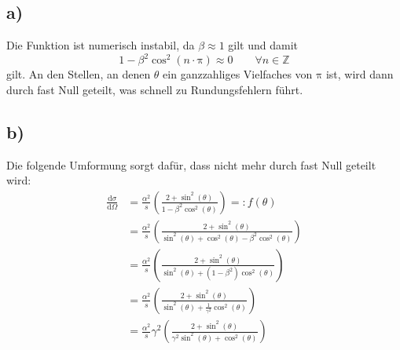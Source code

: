 \documentclass[a4paper, 11pt]{article}
\begin{document}
\subsection*{a)}
Die Funktion ist numerisch instabil, da $\beta \approx 1$ gilt und damit
\begin{equation}
    1 - \beta^2 \cos^2\left(n\cdot\mathrm{\pi}\right) \approx 0 \qquad\forall n \in \mathbb{Z}
\end{equation}
gilt.
An den Stellen, an denen $\theta$ ein ganzzahliges Vielfaches von $\mathrm{\pi}$ ist, wird dann durch fast Null geteilt, was schnell zu Rundungsfehlern führt.
\subsection*{b)}
Die folgende Umformung sorgt dafür, dass nicht mehr durch fast Null geteilt wird:
\begin{align}
    \frac{\mathrm{d}\sigma}{\mathrm{d}\Omega} &= \frac{\alpha^2}{s}
    \left(\frac{2+\sin^2\left(\theta\right)}{1-\beta^2 \cos^2\left(\theta\right)}\right) =: f\left(\theta\right)\\
     &= \frac{\alpha^2}{s} \left(\frac{2+\sin^2\left(\theta\right)}{\sin^2\left(\theta\right)+\cos^2\left(\theta\right)-\beta^2 \cos^2\left(\theta\right)}\right)\\
     &= \frac{\alpha^2}{s} \left(\frac{2+\sin^2\left(\theta\right)}{\sin^2\left(\theta\right)+\left(1-\beta^2\right)\cos^2\left(\theta\right)}\right)\\
     &= \frac{\alpha^2}{s} \left(\frac{2+\sin^2\left(\theta\right)}{\sin^2\left(\theta\right)+\frac{1}{\gamma^2}\cos^2\left(\theta\right)}\right)\\
     &= \frac{\alpha^2}{s} \gamma^2 \left(\frac{2+\sin^2\left(\theta\right)}{\gamma^2\sin^2\left(\theta\right)+\cos^2\left(\theta\right)}\right)
    \label{eqn:dsdogut}
\end{align}
\end{document}
